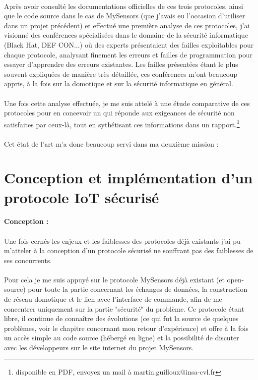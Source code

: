 \documentclass[12 pt]{report}
\begin{document}
\paragraph{}Après avoir consulté les documentations officielles de ces trois protocoles, ainsi que le code source dans le cas de MySensors (que j'avais eu l'occasion d'utiliser dans un projet précédent) et effectué une première analyse de ces protocoles, j'ai visionné des conférences spécialisées dans le domaine de la sécurité informatique (Black Hat, DEF CON...) où des experts présentaient des failles exploitables pour chaque protocole, analysant finement les erreurs et failles de programmation pour essayer d'apprendre des erreurs existantes. Les failles présentées étant le plus souvent expliquées de manière très détaillée, ces conférences m'ont beaucoup appris, à la fois sur la domotique et sur la sécurité informatique en général.
\paragraph{}Une fois cette analyse effectuée, je me suis attelé à une étude comparative de ces protocoles pour en concevoir un qui réponde aux exigeances de sécurité non satisfaites par ceux-là, tout en sythétisant ces informations dans un rapport.\footnote{disponible en PDF, envoyez un mail à martin.guilloux@insa-cvl.fr}
\paragraph{}Cet état de l'art m'a donc beaucoup servi dans ma deuxième mission :
\newpage
\section{Conception et implémentation d'un protocole IoT sécurisé}
\paragraph{Conception :}\paragraph{}Une fois cernés les enjeux et les faiblesses des protocoles déjà existants j'ai pu m'atteler à la conception d'un protocole sécurisé ne souffrant pas des faiblesses de ses concurrents.
\paragraph{}Pour cela je me suis appuyé sur le protocole MySensors déjà existant (et open-source) pour toute la partie concernant les échanges de données, la construction de réseau domotique et le lien avec l'interface de commande, afin de me concentrer uniquement sur la partie "sécurité" du problème. Ce protocole étant libre, il continue de connaître des évolutions (ce qui fut la source de quelques problèmes, voir le chapitre concernant mon retour d'expérience) et offre à la fois un accès simple au code source (hébergé en ligne) et la possibilité de discuter avec les développeurs sur le site internet du projet MySensors.
\end{document}
